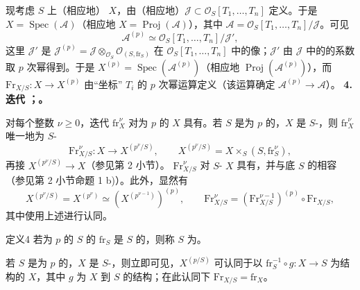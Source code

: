 现考虑 $S$ 上（相应地） $X$，由（相应地）$\mathcal J\subset\mathcal O_S[T_1,\ldots,T_n]$ 定义。于是 $X=\operatorname{Spec}(\mathcal A)$（相应地 $X=\operatorname{Proj}(\mathcal A)$），其中 $\mathcal A=\mathcal O_S[T_1,\ldots,T_n]/\mathcal J$。可见
\[
\mathcal A^{(p)}\simeq\mathcal O_S[T_1,\ldots,T_n]/\mathcal J',
\]
这里 $\mathcal J'$ 是 $\mathcal J^{(p)}=\mathcal J\otimes_{\mathcal O_S}\mathcal O_{(S,\mathrm{fr}_S)}$ 在 $\mathcal O_S[T_1,\ldots,T_n]$ 中的像；$\mathcal J'$ 由 $\mathcal J$ 中的的系数取 $p$ 次幂得到。于是 $X^{(p)}=\operatorname{Spec}(\mathcal A^{(p)})$（相应地 $\operatorname{Proj}(\mathcal A^{(p)})$），而 $\mathrm{Fr}_{X/S}:X\to X^{(p)}$ 由“坐标” $T_i$ 的 $p$ 次幂运算定义（该运算确定 $\mathcal A^{(p)}\to\mathcal A$）。
\textbf{4. 迭代 ；。}

对每个整数 $\nu\geq0$，迭代 $\mathrm{fr}_X^\nu$ 对为 $p$ 的 $X$ 具有。若 $S$ 是为 $p$ 的，$X$ 是 $S$-，则 $\mathrm{fr}_X^\nu$ 唯一地为 $S$-
\[
\mathrm{Fr}_{X/S}^{\nu}:X\longrightarrow X^{(p^\nu/S)},
\qquad X^{(p^\nu/S)}=X\times_S(S,\mathrm{fr}_S^\nu),
\]
再接 $X^{(p^\nu/S)}\to X$（参见第 2 小节）。 $\mathrm{Fr}_{X/S}^{\nu}$ 对 $S$- $X$ 具有，并与底 $S$ 的相容（参见第 2 小节命题 1 b)）。此外，显然有
\[
X^{(p^\nu/S)}=X^{(p^\nu)}\simeq(X^{(p^{\nu-1})})^{(p)},
\qquad
\mathrm{Fr}_{X/S}^{\nu}=(\mathrm{Fr}_{X/S}^{\nu-1})^{(p)}\circ\mathrm{Fr}_{X/S},
\]
其中使用上述进行认同。
\begin{SGAresult}{定义}{4}
若为 $p$ 的 $S$ 的 $\mathrm{fr}_S$ 是 $S$ 的，则称 $S$ 为。
\end{SGAresult}
若 $S$ 是为 $p$ 的，$X$ 是 $S$-，则立即可见，$X^{(p/S)}$ 可认同于以 $\mathrm{fr}_S^{-1}\circ g:X\to S$ 为结构的 $X$，其中 $g$ 为 $X$ 到 $S$ 的结构；在此认同下 $\mathrm{Fr}_{X/S}=\mathrm{fr}_X$。

